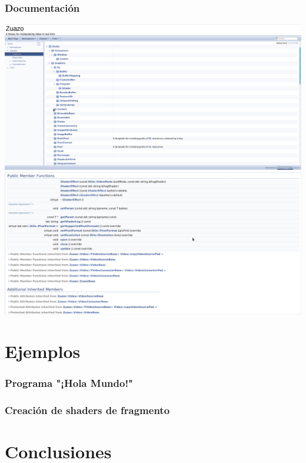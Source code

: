 \documentclass{beamer}
\begin{document}
\begin{frame}[allowframebreaks] \frametitle{Documentación}
	\includegraphics[width=\textwidth]{doxy1} 
	\includegraphics[width=\textwidth]{doxy2}
\end{frame}

%
%
\section{Ejemplos}

\begin{frame}[t, allowframebreaks] \frametitle{Programa "¡Hola Mundo!"}
	
\end{frame}

\begin{frame}[t, allowframebreaks] \frametitle{Creación de shaders de fragmento}
	
	
	
		
\end{frame}


%
%
\section{Conclusiones}
\end{document}
